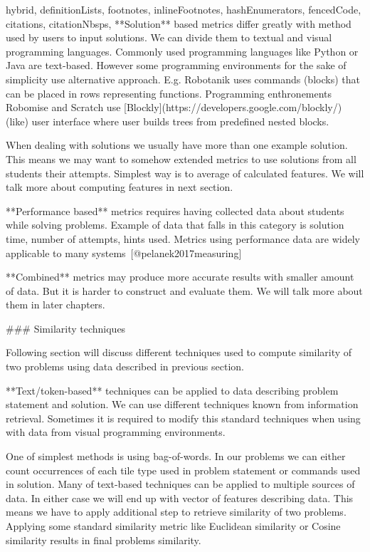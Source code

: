 \documentclass[
  digital, %
  table,   %
  nolof,     %
  nolot,     %
  nocover
]{fithesis3}
\begin{document}
\begin{markdown*}{%
  hybrid,
  definitionLists,
  footnotes,
  inlineFootnotes,
  hashEnumerators,
  fencedCode,
  citations,
  citationNbsps,
}
**Solution** based metrics differ greatly with method used by users to input solutions. We can divide them to textual and visual programming languages. Commonly used programming languages like Python or Java are text-based. However some programming environments for the sake of simplicity use alternative approach. E.g. Robotanik uses commands (blocks) that can be placed in rows representing functions. Programming enthronements Robomise and Scratch use [Blockly](https://developers.google.com/blockly/) (like) user interface where user builds trees from predefined nested blocks.

When dealing with solutions we usually have more than one example solution. This means we may want to somehow extended metrics to use solutions from all students their attempts. Simplest way is to average of calculated features. We will talk more about computing features in next section.

**Performance based** metrics requires having collected data about students while solving problems. Example of data that falls in this category is solution time, number of attempts, hints used. Metrics using performance data are widely applicable to many systems~[@pelanek2017measuring]

**Combined** metrics may produce more accurate results with smaller amount of data. But it is harder to construct and evaluate them. We will talk more about them in later chapters.

### Similarity techniques

Following section will discuss different techniques used to compute similarity of two problems using data described in previous section.

**Text/token-based** techniques can be applied to data describing problem statement and solution. We can use different techniques known from information retrieval. Sometimes it is required to modify this standard techniques when using with data from visual programming environments.

One of simplest methods is using bag-of-words. In our problems we can either count occurrences of each tile type used in problem statement or commands used in solution. Many of text-based techniques can be applied to multiple sources of data. In either case we will end up with vector of features describing data. This means we have to apply additional step to retrieve similarity of two problems. Applying some standard similarity metric like Euclidean similarity or Cosine similarity results in final problems similarity.


\end{markdown*}
\end{document}
